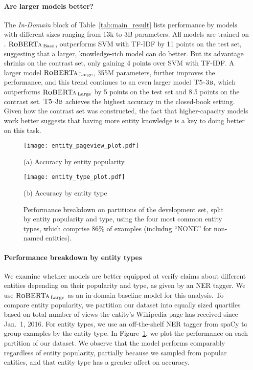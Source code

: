\paragraph{Are larger models better?} The \emph{In-Domain} block of Table~\ref{tab:main_result} lists performance by models with different sizes ranging from 13k to 3B parameters. All models are trained on \oursno. $\textsc{RoBERTa}_{\:\text{Base}}$, outperforms SVM with TF-IDF by 11 points on the test set, suggesting that a larger, knowledge-rich model can do better. But its advantage shrinks on the contrast set, only gaining 4 points over SVM with TF-IDF. A larger model $\textsc{RoBERTa}_{\:\text{Large}}$, 355M parameters, further improves the performance, and this trend continues to an even larger model $\textsc{T5-3b}$, which outperforms $\textsc{RoBERTa}_{\:\text{Large}}$ by 5 points on the test set and 8.5 points on the contrast set. $\textsc{T5-3b}$ achieves the highest accuracy in the closed-book setting. Given how the contrast set was constructed, the fact that higher-capacity models work better suggests that having more entity knowledge is a key to doing better on this task.

\begin{figure}
     \centering
     \begin{minipage}{0.45\textwidth}
         \centering
         \texttt{[image: entity\_pageview\_plot.pdf]}
         \caption*{(a) Accuracy by entity popularity}
         \label{fig1:eval_entity_pop}
     \end{minipage}
     \begin{minipage}{0.45\textwidth}
         \centering
         \texttt{[image: entity\_type\_plot.pdf]}
         \caption*{(b) Accuracy by entity type}
         \label{fig:eval_entity_type}
     \end{minipage}
     \caption{Performance breakdown on partitions of the development set, split by entity popularity and type, using the four most common entity types, which comprise 86\% of examples (includng ``NONE'' for non-named entities).}
     \label{fig:eval_breakdown}
     \vspace{-8pt}
\end{figure}
\paragraph{Performance breakdown by entity types}
We examine whether models are better equipped at verify claims about different entities depending on their popularity and type, as given by an NER tagger. We use $\textsc{RoBERTa}_{\:\text{Large}}$ as an in-domain baseline model for this analysis. To compare entity popularity, we partition our dataset into equally sized quartiles based on total number of views the entity's Wikipedia page has received since Jan.~1, 2016. For entity types, we use an off-the-shelf NER tagger from spaCy \citep{spacy} to group examples by the entity type. In Figure~\ref{fig:eval_breakdown}, we plot the performance on each partition of our dataset. We observe that the model performs comparably regardless of entity popularity, partially because we sampled from popular entities, and that entity type has a greater affect on accuracy.

